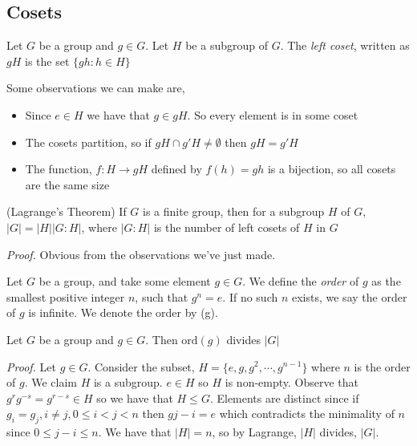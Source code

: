 \documentclass{article}
\begin{document}
\begin{itemize}
	\subsection{Cosets}
	\begin{definition}
		Let $ G $ be a group and $ g\in G $. Let $ H $ be a subgroup of $ G $. The \textit{left coset}, written as $ gH $ is the set $ \{gh : h\in H\} $
	\end{definition}
Some observations we can make are,
\begin{itemize}
	\item Since $ e\in H $ we have that $ g\in gH $. So every element is in some coset
	\item The cosets partition, so if $ gH\cap g'H\ne \emptyset $ then $ gH=g'H $
	\item The function, $ f: H\rightarrow gH $ defined by $ f(h)= gh $ is a bijection, so all cosets are the same size
\end{itemize}
\begin{theorem}
	(Lagrange's Theorem) If $ G $ is a finite group, then for a subgroup $ H $ of $ G $, $ |G|=|H||G:H| $, where $ |G:H| $ is the number of left cosets of $ H $ in $ G $
\end{theorem}
\textit{Proof.} Obvious from the observations we've just made.

\begin{definition}
	Let $ G $ be a group, and take some element $ g\in G $. We define the \textit{order} of $ g $ as the smallest positive integer $ n $, such that $ g^n = e $. If no such $ n $ exists, we say the order of $ g $ is infinite. We denote the order by (g).
\end{definition}
\begin{proposition}
	Let $ G $ be a group and $ g\in G $. Then $ \mathrm {ord}(g) $ divides $ |G| $
\end{proposition}
\textit{Proof.} Let $ g\in G $. Consider the subset, $ H=\{e, g, g^2,\cdots, g^{n-1}\} $ where $ n $ is the order of $ g $. We claim $ H $ is a subgroup. $ e\in H $ so $ H  $ is non-empty. Observe that $ g^rg^{-s}=g^{r-s}\in H $ so we have that $ H\le G $. Elements are distinct since if $ g_i=g_j, i\ne j, 0\le i<j<n $ then $ g{j-i}=e $ which contradicts the minimality of $ n $ since $ 0\le j-i\le n $. We have that $ |H|=n $, so by Lagrange, $ |H| $ divides, $ |G| $.

\end{itemize}
\end{document}
